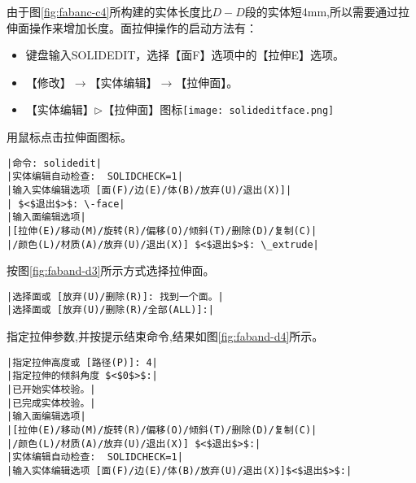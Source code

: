 \begin{procedure}
由于图\ref{fig:fabanc-c4}所构建的实体长度比$D-D$段的实体短4mm,所以需要通过拉伸面操作来增加长度。面拉伸操作的启动方法有：
\begin{itemize}
\item 键盘输入SOLIDEDIT，选择【面F】选项中的【拉伸E】选项。
\item 【修改】$\rightarrow$【实体编辑】$\rightarrow$【拉伸面】。
\item 【实体编辑】$\triangleright$【拉伸面】图标\texttt{[image: solideditface.png]}
\end{itemize}
用鼠标点击拉伸面图标。
\begin{lstlisting}
|命令: solidedit|
|实体编辑自动检查:  SOLIDCHECK=1|
|输入实体编辑选项 [面(F)/边(E)/体(B)/放弃(U)/退出(X)]|
| $<$退出$>$: \-face|
|输入面编辑选项|
|[拉伸(E)/移动(M)/旋转(R)/偏移(O)/倾斜(T)/删除(D)/复制(C)|
|/颜色(L)/材质(A)/放弃(U)/退出(X)] $<$退出$>$: \_extrude|
\end{lstlisting}
按图\ref{fig:faband-d3}所示方式选择拉伸面。
\begin{lstlisting}
|选择面或 [放弃(U)/删除(R)]: 找到一个面。|
|选择面或 [放弃(U)/删除(R)/全部(ALL)]:|
\end{lstlisting}
指定拉伸参数,并按提示结束命令,结果如图\ref{fig:faband-d4}所示。
\begin{lstlisting}
|指定拉伸高度或 [路径(P)]: 4|
|指定拉伸的倾斜角度 $<$0$>$:|
|已开始实体校验。|
|已完成实体校验。|
|输入面编辑选项|
|[拉伸(E)/移动(M)/旋转(R)/偏移(O)/倾斜(T)/删除(D)/复制(C)|
|/颜色(L)/材质(A)/放弃(U)/退出(X)] $<$退出$>$:|
|实体编辑自动检查:  SOLIDCHECK=1|
|输入实体编辑选项 [面(F)/边(E)/体(B)/放弃(U)/退出(X)]$<$退出$>$:|
\end{lstlisting}
\end{procedure}

\begin{figure}[htbp]
\centering
\begin{floatrow}[3]
\end{floatrow}
\end{figure}
